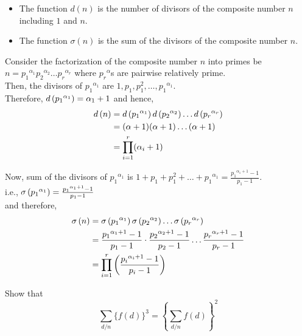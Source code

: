 \documentclass[12pt,class=book,crop=false]{standalone}
\begin{document}
\begin{soln}\hfill
    \begin{itemize}
        \item The function $ d(n) $ is the number of divisors of the composite number $ n $ including $ 1 $ and $ n $.
        \item The function $ \sigma(n) $ is the sum of the divisors of the composite number $ n $.
    \end{itemize}

    Consider the factorization of the composite number $ n $ into primes be $ n= {p_1}^{\alpha_1}{p_2}^{\alpha_2} \dots {p_r}^{\alpha_r}$ where $ {p_r}^{\alpha} $s are pairwise relatively prime.\\ %
    Then, the divisors of $ {p_1}^{\alpha_1}  $ are $ 1,p_1,p_1^2,\dots, {p_1}^{\alpha_1} $.\\
    Therefore, $ d\left( {p_1}^{\alpha_1} \right)=\alpha_1+1 $ and hence,
    \begin{align*}
        d\left( n \right)&=d\left( {p_1}^{\alpha_1} \right)d\left( {p_2}^{\alpha_2} \right)\dots d\left( {p_r}^{\alpha_r} \right)\\
        &=(\alpha+1)(\alpha+1)\dots(\alpha+1)\\
        &= \prod_{i=1}^r (\alpha_i+1)
    \end{align*}

    Now, sum of the divisors of $ {p_1}^{\alpha_1} $ is $ 1+p_1+p_1^2+\dots+ {p_1}^{\alpha_1}=\frac{{p_1}^{\alpha_1+1}-1}{p_1-1} $.\\
    i.e., $ \sigma\left( {p_1}^{\alpha_1} \right)=\frac{{p_1}^{\alpha_1+1}-1}{p_1-1}  $\\
    and therefore,
    \begin{align*}
        \sigma\left( n \right)&=\sigma\left( {p_1}^{\alpha_1} \right)\sigma\left( {p_2}^{\alpha_2} \right)\dots\sigma\left( {p_r}^{\alpha_r} \right)\\
        &=\frac{{p_1}^{\alpha_1+1}-1}{p_1-1} \cdot \frac{{p_2}^{\alpha_2+1}-1}{p_2-1}\dots\frac{{p_r}^{\alpha_r+1}-1}{p_r-1}\\
        &= \prod_{i=1}^r \left( \frac{{p_i}^{\alpha_i+1}-1}{p_i-1} \right)
    \end{align*}
\end{soln}
\begin{qn}
    Show that
    \[\sum_{d/n}\{f(d)\}^3=\left\{ \sum_{d/n} f(d) \right\}^2\]
\end{qn}
\end{document}

